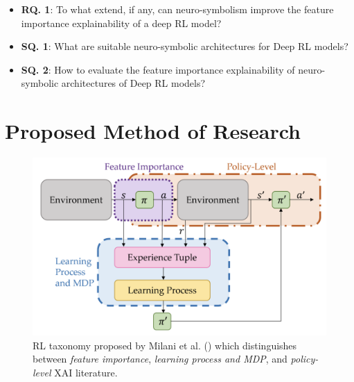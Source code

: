 \documentclass[11pt]{article}
\begin{document}
\begin{itemize}
  \item \textbf{RQ. 1}: To what extend, if any, can neuro-symbolism improve the feature importance explainability of a deep RL model?
  \item \textbf{SQ. 1}: What are suitable neuro-symbolic architectures for Deep RL models?
  \item \textbf{SQ. 2}: How to evaluate the feature importance explainability of neuro-symbolic architectures of Deep RL models?
\end{itemize}



\section{Proposed Method of Research}

\begin{figure}[ht]
  \includegraphics[width=\linewidth]{images/rl_taxonomy.png}
  \caption{RL taxonomy proposed by Milani et al. (\citeyear{Milani2022}) which distinguishes between \textit{feature importance}, \textit{learning process and MDP}, and \textit{policy-level} XAI literature.}
  \label{fig:rl_taxonomy}
\end{figure}
\end{document}
